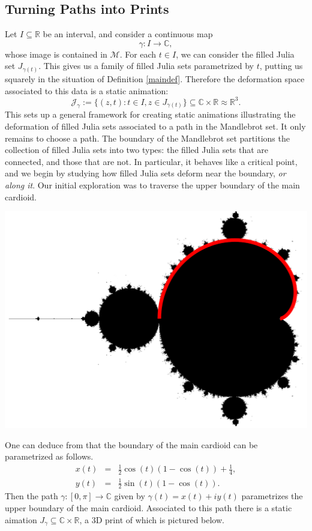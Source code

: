 \documentclass[12 pt]{article}
\newcommand{\bR}{\mathbb{R}}
\newcommand{\bC}{\mathbb{C}}
\newcommand{\cJ}{\mathcal{J}}
\newcommand{\cM}{\mathcal{M}}
\begin{document}
\subsection{Turning Paths into Prints}\label{P2P}
Let $I\subseteq\bR$ be an interval, and consider a continuous map
\[\gamma:I\to\bC,\]
whose image is contained in $\cM$.  For each $t\in I$, we can consider the filled Julia set $J_{\gamma(t)}$.  This gives us a family of filled Julia sets parametrized by $t$, putting us squarely in the situation of Definition \ref{maindef}.  Therefore the deformation space associated to this data is a static animation:
\[\cJ_\gamma:=\{(z,t):t\in I, z\in J_{\gamma(t)}\}\subseteq\bC\times\bR\approx\bR^3.\]
This sets up a general framework for creating static animations illustrating the deformation of filled Julia sets associated to a path in the Mandlebrot set.  It only remains to choose a path.  The boundary of the Mandlebrot set partitions the collection of filled Julia sets into two types: the filled Julia sets that are connected, and those that are not.  In particular, it behaves like a critical point, and we begin by studying how filled Julia sets deform near the boundary, \textit{or along it}.  Our initial exploration was to traverse the upper boundary of the main cardioid.
\begin{center}
\includegraphics[width=.6\textwidth]{images/mandlePathCropped.png}
\end{center}
One can deduce from \cite[Chapter 10]{Milnor} that the boundary of the main cardioid can be parametrized as follows.\begin{eqnarray*}
    x(t) &=& \frac{1}{2}\cos(t)(1-\cos(t)) + \frac{1}{4},\\
    y(t) &=& \frac{1}{2}\sin(t)(1-\cos(t)).
\end{eqnarray*}
Then the path $\gamma:[0,\pi]\to\bC$ given by $\gamma(t) = x(t) + iy(t)$ parametrizes the upper boundary of the main cardioid.  Associated to this path there is a static aimation $J_\gamma\subseteq\bC\times\bR$, a 3D print of which is pictured below.
\end{document}
